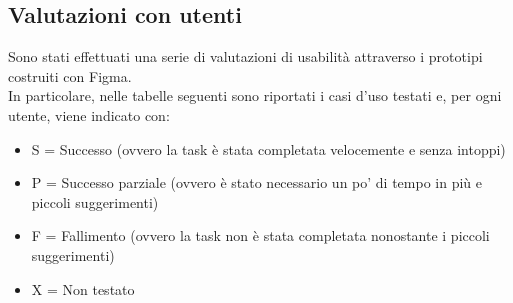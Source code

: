         \subsection{Valutazioni con utenti}
            Sono stati effettuati una serie di valutazioni di usabilità attraverso i prototipi costruiti con Figma. \\
            In particolare, nelle tabelle seguenti sono riportati i casi d'uso testati e, per ogni utente, viene indicato con:
            \begin{itemize}
                \item S = Successo (ovvero la task è stata completata velocemente e senza intoppi)
                \item P = Successo parziale (ovvero è stato necessario un po' di tempo in più e piccoli suggerimenti)
                \item F = Fallimento (ovvero la task non è stata completata nonostante i piccoli suggerimenti)
                \item X = Non testato
            \end{itemize}
        
